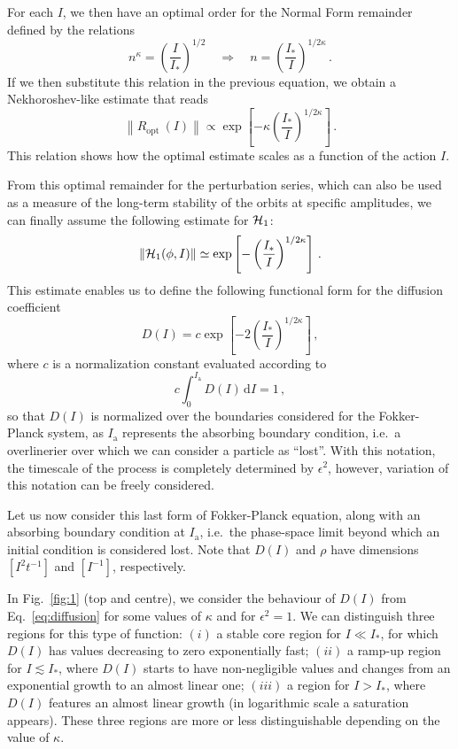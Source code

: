 For each $I$, we then have an optimal order for the Normal Form remainder defined by the relations
\begin{equation}
    n^\kappa=\left(\frac{I}{I_\ast}\right)^{1 / 2} \quad \Rightarrow \quad n=\left(\frac{I_\ast}{I}\right)^{1 / 2 \kappa} \,.
\end{equation}
If we then substitute this relation in the previous equation, we obtain a Nekhoroshev-like estimate that reads
\begin{equation}
    \left\|R_{\text {opt }}(I)\right\| \propto \exp \left[-\kappa\left(\frac{I_*}{I}\right)^{1 / 2 \kappa}\right] \,.
\end{equation}
This relation shows how the optimal estimate scales as a function of the action $I$. 

From this optimal remainder for the perturbation series, which can also be used as a measure of the long-term stability of the orbits at specific amplitudes, we can finally assume the following estimate for $\mathcal{H}_1$:
\begin{equation}
    \left\|\mathcal{H}_1(\phi, I)\right\| \simeq \exp \left[-\left(\frac{I_\ast}{I}\right)^{1/2\kappa}\right] \,.
\end{equation}
This estimate enables us to define the following functional form for the diffusion coefficient
\begin{equation}
    D(I) = c \exp\left[-2\left(\frac{I_\ast}{I}\right)^{1/2\kappa}\right]\,,
    \label{eq:diffusion}
\end{equation}
where $c$ is a normalization constant evaluated according to
\begin{equation}
    c \int_0^{I_\text{a}} D(I)\,\mathrm{d}I = 1 \,,
\end{equation}
so that $D(I)$ is normalized over the boundaries considered for the Fokker-Planck system, as $I_\text{a}$ represents the absorbing boundary condition, i.e.\ a overlinerier over which we can consider a particle as ``lost''. With this notation, the timescale of the process is completely determined by $\epsilon^2$, however, variation of this notation can be freely considered.

Let us now consider this last form of Fokker-Planck equation, along with an absorbing boundary condition at $I_{\mathrm{a}}$, i.e.\ the phase-space limit beyond which an initial condition is considered lost. Note that $D(I)$ and $\rho$ have dimensions $[I^2t^{-1}]$ and $[I^{-1}]$, respectively.

In Fig.~\ref{fig:1} (top and centre), we consider the behaviour of $D(I)$ from Eq.~\eqref{eq:diffusion} for some values of $\kappa$ and for $\epsilon^2 = 1$. We can distinguish three regions for this type of function: $(i)$ a stable core region for $I \ll I_\ast$, for which $D(I)$ has values decreasing to zero exponentially fast; $(ii)$ a ramp-up region for $I \lesssim I_\ast$, where $D(I)$ starts to have non-negligible values and changes from an exponential growth to an almost linear one; $(iii)$ a region for $I >  I_\ast$, where $D(I)$ features an almost linear growth (in logarithmic scale a saturation appears). These three regions are more or less distinguishable depending on the value of $\kappa$. 

